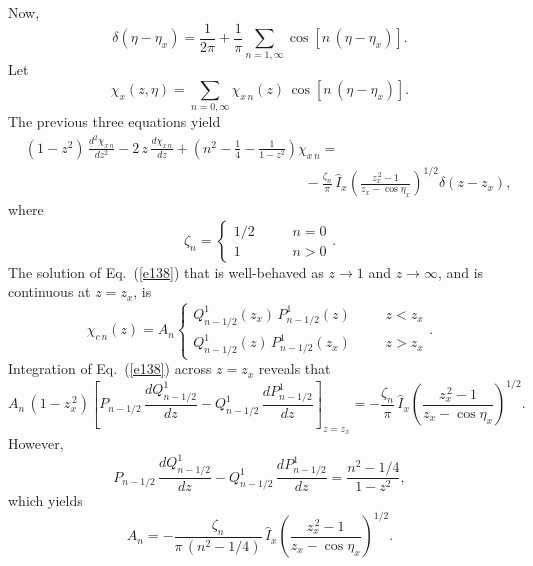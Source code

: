 \documentclass[12pt,prb,aps]{revtex4-1}
\begin{document}
Now,\,\cite{jack}
\begin{equation}
\delta(\eta-\eta_x) = \frac{1}{2\pi} + \frac{1}{\pi}\sum_{n=1,\infty}\cos[n\,(\eta-\eta_x)].
\end{equation}
Let
\begin{equation}
\chi_x(z,\eta) = \sum_{n=0,\infty}\chi_{x\,n}(z)\,\cos[n\,(\eta-\eta_x)].
\end{equation}
The previous three equations yield
\begin{align}\label{e138}
&(1-z^{2})\,\frac{d^2\chi_{x\,n}}{d z^{2}}-2\,z\,\frac{d\chi_{x\,n}}{dz}+\left(n^{2}-\frac{1}{4}-\frac{1}{1-z^{2}}\right)\chi_{x\,n}
 =\nonumber\\[0.5ex]
&\phantom{===============}- \frac{\zeta_n}{\pi}\,\hat{I}_x\left(\frac{z_x^{\,2}-1}{z_x-\cos\eta_x}\right)^{1/2}\delta(z-z_x),
\end{align}
where
\begin{equation}
\zeta_n =\left\{\begin{array}{ccc}1/2&~~~~~&n=0\\[0.5ex]
1&&n>0\end{array}\right..
\end{equation}
The solution of Eq.~(\ref{e138}) that is well-behaved as $z\rightarrow 1$ and $z\rightarrow\infty$, and is continuous at $z=z_x$, is\,\cite{abram,abrama}
\begin{equation}
\chi_{c\,n}(z) = A_n\left\{\begin{array}{ccc} Q_{n-1/2}^1(z_x)\,P_{n-1/2}^1(z)&~~~~&z<z_x\\[0.5ex]
 Q_{n-1/2}^1(z)\,P_{n-1/2}^1(z_x)&&z>z_x\end{array}\right..
\end{equation}
Integration of Eq.~(\ref{e138}) across $z=z_x$ reveals that
\begin{equation}
A_n\,(1-z_x^{\,2})\left[P_{n-1/2}\,\frac{dQ_{n-1/2}^1}{dz} - Q_{n-1/2}^1\,\frac{dP_{n-1/2}^1}{dz}\right]_{z=z_x}= -\frac{\zeta_n}{\pi}\,\hat{I}_x\left(\frac{z_x^{\,2}-1}{z_x-\cos\eta_x}\right)^{1/2}.
\end{equation}
However,\,\cite{morsey}
\begin{equation}
P_{n-1/2}\,\frac{dQ_{n-1/2}^1}{dz} - Q_{n-1/2}^1\,\frac{dP_{n-1/2}^1}{dz}= \frac{n^{2}-1/4}{1-z^{2}},
\end{equation}
which yields 
\begin{equation}
A_n = -\frac{\zeta_n}{\pi\,(n^{2}-1/4)}\,\hat{I}_x\left(\frac{z_x^{\,2}-1}{z_x-\cos\eta_x}\right)^{1/2}.
\end{equation}
\end{document}
